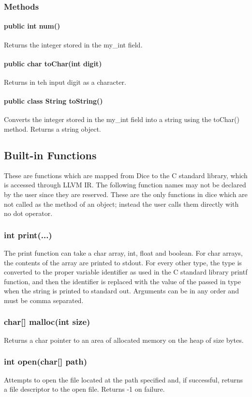 \begin{homeworkProblem}
	\subsubsection{Methods}
	\paragraph{public int num()}
	Returns the integer stored in the my\_int field.
	\paragraph{public char toChar(int digit)}
	Returns in teh input digit as a character.
	\paragraph{public class String toString()}
	Converts the integer stored in the my\_int field into a string using the toChar() method. Returns a string object.
	\subsection{Built-in Functions}
	These are functions which are mapped from Dice to the C standard library, which is accessed through LLVM IR. The following function names may not be declared by the user since they are reserved. These are the only functions in dice which are not called as the method of an object; instead the user calls them directly with no dot operator.
	\subsubsection{int print(...)}
	The print function can take a char array, int, float and boolean. For char arrays, the contents of the array are printed to stdout. For every other type, the type is converted to the proper variable identifier as used in the C standard library printf function, and then the identifier is replaced with the value of the passed in type when the string is printed to standard out. Arguments can be in any order and must be comma separated.
	\subsubsection{char[] malloc(int size)}
	Returns a char pointer to an area of allocated memory on the heap of size bytes.
	\subsubsection{int open(char[] path)}
	Attempts to open the file located at the path specified and, if successful, returns a file descriptor to the open file. Returns -1 on failure.

\end{homeworkProblem}
